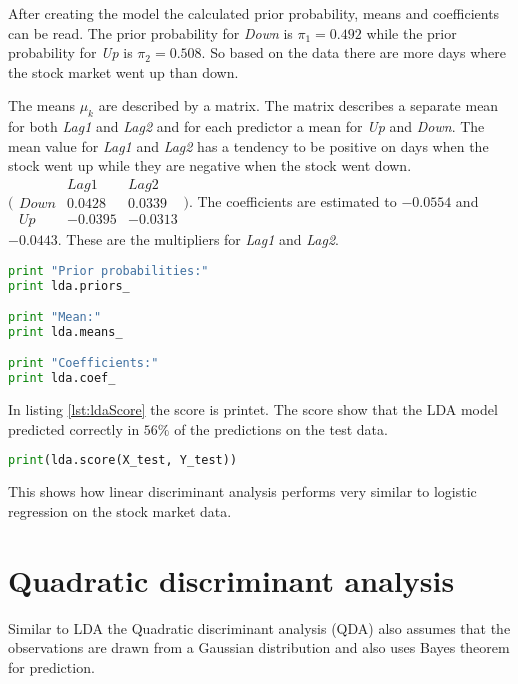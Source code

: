 After creating the model the calculated prior probability, means and coefficients can be read. The prior probability for \emph{Down} is $\pi_1=0.492$ while the prior probability for \emph{Up} is $\pi_2=0.508$. So based on the data there are more days where the stock market went up than down. 

The means $\mu_k$ are described by a matrix. The matrix describes a separate mean for both \emph{Lag1} and \emph{Lag2} and for each predictor a mean for \emph{Up} and \emph{Down}. The mean value for \emph{Lag1} and \emph{Lag2} has a tendency to be positive on days when the stock went up while they are negative when the stock went down.  $\bigl( \begin{smallmatrix} 	 & Lag1 & Lag2	\\ 	 Down & 0.0428 & 0.0339 \\ 	 Up & -0.0395 & -0.0313 \end{smallmatrix} \bigr) $. The coefficients are estimated to $-0.0554$ and $-0.0443$. These are the multipliers for \emph{Lag1} and \emph{Lag2}.

\begin{lstlisting}[language=Python, label=lst:ldaProperties, caption=printing lda prior mean and coefficients]
print "Prior probabilities:"
print lda.priors_

print "Mean:"
print lda.means_

print "Coefficients:"
print lda.coef_
\end{lstlisting}

In listing \ref{lst:ldaScore} the score is printet. The score show that the LDA model predicted correctly in $56\%$ of the predictions on the test data. 
\begin{lstlisting}[language=Python, label=lst:ldaScore, caption=printing lda score]
print(lda.score(X_test, Y_test))
\end{lstlisting}

This shows how linear discriminant analysis performs very similar to logistic regression on the stock market data.

\section{Quadratic discriminant analysis}
Similar to LDA the Quadratic discriminant analysis (QDA) also assumes that the observations are drawn from a Gaussian distribution and also uses Bayes theorem for prediction. 

